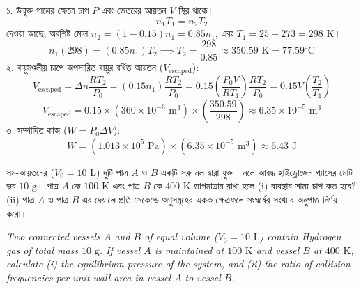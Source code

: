 \documentclass[12pt, a4paper]{article}
\begin{document}
{\vspace{1em}

\begin{tcolorbox}[solutionbox={সমাধান (Solution)}]
\noindent
১. উন্মুক্ত পাত্রের ক্ষেত্রে চাপ $P$ এবং ভেতরের আয়তন $V$ স্থির থাকে।
\[ n_1 T_1 = n_2 T_2 \]
দেওয়া আছে, অবশিষ্ট মোল $n_2 = (1 - 0.15) n_1 = 0.85 n_1$, এবং $T_1 = 25 + 273 = 298\text{ K}$।
\[ n_1 (298) = (0.85 n_1) T_2 \implies T_2 = \frac{298}{0.85} \approx 350.59\text{ K} = 77.59^\circ\text{C} \]
২. বায়ুমণ্ডলীয় চাপে অপসারিত বায়ুর বর্ধিত আয়তন ($V_{\text{escaped}}$):
\[ V_{\text{escaped}} = \Delta n \frac{R T_2}{P_0} = (0.15 n_1) \frac{R T_2}{P_0} = 0.15 \left(\frac{P_0 V}{R T_1}\right) \frac{R T_2}{P_0} = 0.15 V \left(\frac{T_2}{T_1}\right) \]
\[ V_{\text{escaped}} = 0.15 \times (360 \times 10^{-6}\text{ m}^3) \times \left(\frac{350.59}{298}\right) \approx 6.35 \times 10^{-5}\text{ m}^3 \]
৩. সম্পাদিত কাজ ($W = P_0 \Delta V$):
\[ W = (1.013 \times 10^5\text{ Pa}) \times (6.35 \times 10^{-5}\text{ m}^3) \approx 6.43\text{ J} \]
\end{tcolorbox}

\vspace{1.5em}
\begin{tcolorbox}[questionbox={প্রশ্ন (Question) 9}]
\noindent
সম-আয়তনের ($V_0 = 10\text{ L}$) দুটি পাত্র $A$ ও $B$ একটি সরু নল দ্বারা যুক্ত। নলে আবদ্ধ হাইড্রোজেন গ্যাসের মোট ভর $10\text{ g}$। পাত্র $A$-কে $100\text{ K}$ এবং পাত্র $B$-কে $400\text{ K}$ তাপমাত্রায় রাখা হলে (i) ব্যবস্থার সাম্য চাপ কত হবে? (ii) পাত্র $A$ ও পাত্র $B$-এর দেয়ালে প্রতি সেকেন্ডে অণুসমূহের একক ক্ষেত্রফলে সংঘর্ষের সংখ্যার অনুপাত নির্ণয় করো।

\vspace{0.8em}
\begin{english}
\noindent\textit{\color{darkgray}
Two connected vessels $A$ and $B$ of equal volume ($V_0 = 10\text{ L}$) contain Hydrogen gas of total mass $10\text{ g}$. If vessel $A$ is maintained at $100\text{ K}$ and vessel $B$ at $400\text{ K}$, calculate (i) the equilibrium pressure of the system, and (ii) the ratio of collision frequencies per unit wall area in vessel $A$ to vessel $B$.
}
\end{english}
\end{tcolorbox}

\vspace{1em}

}
\end{document}
